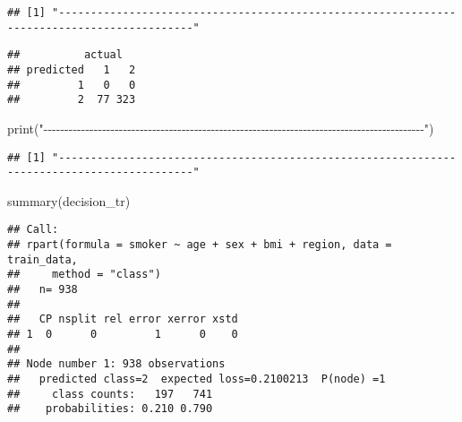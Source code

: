\documentclass[
]{article}
\newenvironment{Shaded}{\begin{snugshade}}{\end{snugshade}}
\newcommand{\AttributeTok}[1]{\textcolor[rgb]{0.77,0.63,0.00}{#1}}
\newcommand{\CommentTok}[1]{\textcolor[rgb]{0.56,0.35,0.01}{\textit{#1}}}
\newcommand{\FunctionTok}[1]{\textcolor[rgb]{0.00,0.00,0.00}{#1}}
\newcommand{\NormalTok}[1]{#1}
\newcommand{\OtherTok}[1]{\textcolor[rgb]{0.56,0.35,0.01}{#1}}
\newcommand{\SpecialCharTok}[1]{\textcolor[rgb]{0.00,0.00,0.00}{#1}}
\newcommand{\StringTok}[1]{\textcolor[rgb]{0.31,0.60,0.02}{#1}}
\begin{document}
\begin{verbatim}
## [1] "-------------------------------------------------------------------------------------------"
\end{verbatim}

\begin{Shaded}
\end{Shaded}

\begin{verbatim}
##          actual
## predicted   1   2
##         1   0   0
##         2  77 323
\end{verbatim}

\begin{Shaded}
\begin{Highlighting}[]
\FunctionTok{print}\NormalTok{(}\StringTok{"{-}{-}{-}{-}{-}{-}{-}{-}{-}{-}{-}{-}{-}{-}{-}{-}{-}{-}{-}{-}{-}{-}{-}{-}{-}{-}{-}{-}{-}{-}{-}{-}{-}{-}{-}{-}{-}{-}{-}{-}{-}{-}{-}{-}{-}{-}{-}{-}{-}{-}{-}{-}{-}{-}{-}{-}{-}{-}{-}{-}{-}{-}{-}{-}{-}{-}{-}{-}{-}{-}{-}{-}{-}{-}{-}{-}{-}{-}{-}{-}{-}{-}{-}{-}{-}{-}{-}{-}{-}{-}{-}"}\NormalTok{)}
\end{Highlighting}
\end{Shaded}

\begin{verbatim}
## [1] "-------------------------------------------------------------------------------------------"
\end{verbatim}

\begin{Shaded}
\begin{Highlighting}[]
\FunctionTok{summary}\NormalTok{(decision\_tr) }
\end{Highlighting}
\end{Shaded}

\begin{verbatim}
## Call:
## rpart(formula = smoker ~ age + sex + bmi + region, data = train_data, 
##     method = "class")
##   n= 938 
## 
##   CP nsplit rel error xerror xstd
## 1  0      0         1      0    0
## 
## Node number 1: 938 observations
##   predicted class=2  expected loss=0.2100213  P(node) =1
##     class counts:   197   741
##    probabilities: 0.210 0.790
\end{verbatim}
\end{document}
